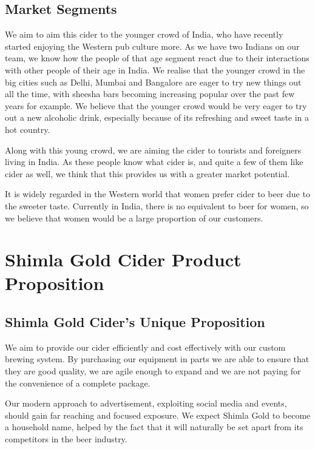 \documentclass[11pt]{article}
\begin{document}
  \subsection{Market Segments}
We aim to aim this cider to the younger crowd of India, who have recently
started enjoying the Western pub culture more. As we have two Indians on our
team, we know how the people of that age segment react due to their interactions
with other people of their age in India. We realise that the younger crowd in
the big cities such as Delhi, Mumbai and Bangalore are eager to try new things
out all the time, with sheesha bars becoming increasing popular over the past
few years for example. We believe that the younger crowd would be very eager to
try out a new alcoholic drink, especially because of its refreshing and sweet
taste in a hot country.

Along with this young crowd, we are aiming the cider to tourists and foreigners
living in India. As these people know what cider is, and quite a few of them
like cider as well, we think that this provides us with a greater market
potential.

It is widely regarded in the Western world that women prefer cider to beer due
to the sweeter taste. Currently in India, there is no equivalent to beer for
women, so we believe that women would be a large proportion of our customers.

\newpage
\section{Shimla Gold Cider Product Proposition}

\subsection{Shimla Gold Cider's Unique Proposition}
We aim to provide our cider efficiently and cost effectively with our custom
brewing system. By purchasing our equipment in parts we are able to ensure that
they are good quality, we are agile enough to expand and we are not paying for
the convenience of a complete package.

Our modern approach to advertisement, exploiting social media and events, should 
gain far reaching and focused exposure. We expect Shimla Gold to become a
household name, helped by the fact that it will naturally be set apart from its
competitors in the beer industry. 
\end{document}
